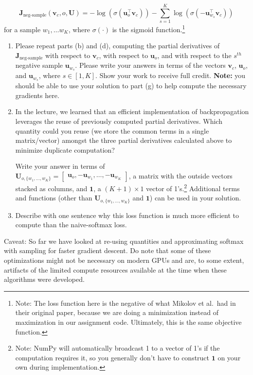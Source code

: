 \documentclass{article}
\begin{document}
\begin{enumerate}[label=(\alph*)]
\begin{equation}
\bm J_{\text{neg-sample}}(\bm v_c, o, \bm U) = -\log(\sigma(\bm u_o^\top \bm v_c)) - \sum_{s=1}^K \log(\sigma(-\bm u_{w_s}^\top \bm v_c))
\end{equation}
for a sample $w_1, \ldots w_K$, where $\sigma(\cdot)$ is the sigmoid function.\footnote{Note: The loss function here is the negative of what Mikolov et al.\ had in their original paper, because we are doing a minimization instead of maximization in our assignment code. Ultimately, this is the same objective function.}

\begin{enumerate}[label=(\roman*)]
\item Please repeat parts (b) and (d), computing the partial derivatives of $\bm J_{\text{neg-sample}}$ with respect to $\bm v_c$, with respect to $\bm u_o$, and with respect to the $s^{th}$ negative sample $\bm u_{w_s}$. Please write your answers in terms of the vectors $\bm v_c$, $\bm u_o$, and $\bm u_{w_s}$, where $s \in [1, K]$. Show your work to receive full credit. \textbf{Note:} you should be able to use your solution to part (g) to help compute the necessary gradients here.

\item In the lecture, we learned that an efficient implementation of backpropagation leverages the reuse of previously computed partial derivatives. Which quantity could you reuse (we store the common terms in a single matrix/vector) amongst the three partial derivatives calculated above to minimize duplicate computation? 

Write your answer in terms of \\ $\bm{U}_{o, \{w_1, \dots, w_K\}} = \begin{bmatrix} \bm{u}_o, -\bm{u}_{w_1}, \dots, -\bm{u}_{w_K} \end{bmatrix}$, a matrix with the outside vectors stacked as columns, and $\bm{1}$, a $(K + 1) \times 1$ vector of 1's.\footnote{Note: NumPy will automatically broadcast 1 to a vector of 1's if the computation requires it, so you generally don't have to construct $\bm{1}$ on your own during implementation.}
Additional terms and functions (other than $\bm{U}_{o, \{w_1, \dots, w_K\}}$ and $\bm{1}$) can be used in your solution.
\item Describe with one sentence why this loss function is much more efficient to compute than the naive-softmax loss.
\end{enumerate}

Caveat: So far we have looked at re-using quantities and approximating softmax with sampling for faster gradient descent. Do note that some of these optimizations might not be necessary on modern GPUs and are, to some extent, artifacts of the limited compute resources available at the time when these algorithms were developed.


\end{enumerate}
\end{document}

